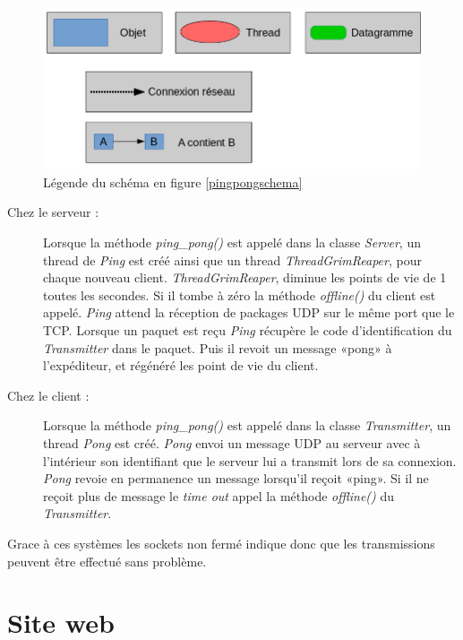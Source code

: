 \documentclass[a4paper,11pt]{report}
\begin{document}
\begin{figure}[th]
      \begin{center}
        \includegraphics[scale=0.3]{Assets/l_r_3.png}
        \caption{Légende du schéma en figure \ref{pingpongschema}}
        \label{pingpongschemalegende}
      \end{center}
\end{figure}


\begin{description}
  \item[Chez le serveur : ]
  Lorsque la méthode \textit{ping\_pong()} est appelé dans la classe \textit{Server}, un thread de \textit{Ping} est créé ainsi que un thread \textit{ThreadGrimReaper}, pour chaque nouveau client. 
\textit{ThreadGrimReaper}, diminue les points de vie de 1 toutes les secondes. Si il tombe à zéro la méthode \textit{offline()} du client est appelé.
\textit{Ping} attend la réception de packages UDP sur le même port que le TCP. Lorsque un paquet est reçu \textit{Ping} récupère le code d’identification du \textit{Transmitter} dans le paquet. Puis il revoit un message «pong» à l’expéditeur, et régénéré les point de vie du client.
  
  \item[Chez le client : ]
  Lorsque la méthode \textit{ping\_pong()} est appelé dans la classe \textit{Transmitter}, un thread \textit{Pong} est créé. \textit{Pong} envoi un message UDP au serveur avec à l’intérieur son identifiant que le serveur lui a transmit lors de sa connexion. \textit{Pong} revoie en permanence un message lorsqu’il reçoit «ping». Si il ne reçoit plus de message le \textit{time out} appel la méthode \textit{offline()} du \textit{Transmitter}.
\end{description}

Grace à ces systèmes les sockets non fermé indique donc que les transmissions peuvent être effectué sans problème.


\chapter{Site web}
\end{document}
